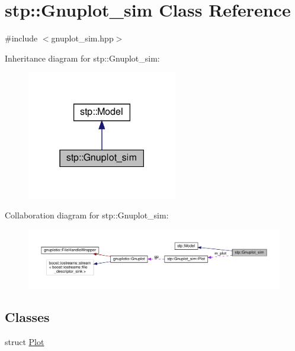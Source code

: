 \hypertarget{classstp_1_1_gnuplot__sim}{}\section{stp\+:\+:Gnuplot\+\_\+sim Class Reference}
\label{classstp_1_1_gnuplot__sim}


{\ttfamily \#include $<$gnuplot\+\_\+sim.\+hpp$>$}



Inheritance diagram for stp\+:\+:Gnuplot\+\_\+sim\+:
\nopagebreak
\begin{figure}[H]
\begin{center}
\leavevmode
\includegraphics[width=186pt]{classstp_1_1_gnuplot__sim__inherit__graph}
\end{center}
\end{figure}


Collaboration diagram for stp\+:\+:Gnuplot\+\_\+sim\+:
\nopagebreak
\begin{figure}[H]
\begin{center}
\leavevmode
\includegraphics[width=350pt]{classstp_1_1_gnuplot__sim__coll__graph}
\end{center}
\end{figure}
\subsection*{Classes}
\begin{DoxyCompactItemize}
\item 
struct \hyperlink{structstp_1_1_gnuplot__sim_1_1_plot}{Plot}
\end{DoxyCompactItemize}
